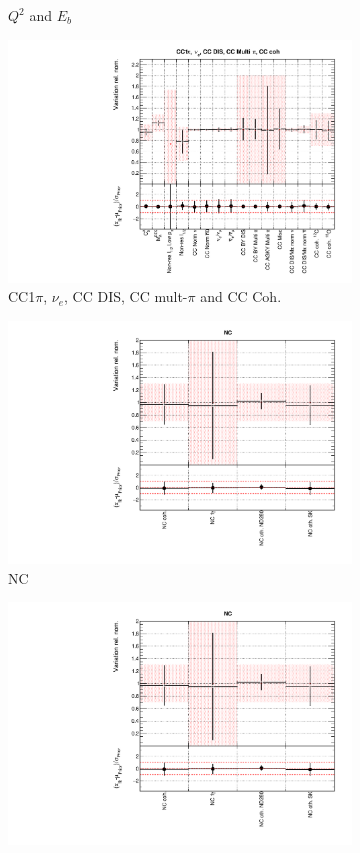 \begin{figure}
\begin{subfigure}{0.49\textwidth}
  \caption{$Q^2$ and $E_b$}
\end{subfigure}
\begin{subfigure}{0.49\textwidth}
  \centering
  \includegraphics[width=0.9\linewidth]{figs/asmvxsec3}
  \caption{CC1$\pi$, $\nu_e$, CC DIS, CC mult-$\pi$ and CC Coh.}
\end{subfigure}
\begin{subfigure}{0.49\textwidth}
  \centering
  \includegraphics[width=0.9\linewidth]{figs/asmvxsec4}
  \caption{NC}
\end{subfigure}
\begin{subfigure}{0.49\textwidth}
  \centering
  \includegraphics[width=0.9\linewidth]{figs/asmvxsec4}

\end{subfigure}
\end{figure}
